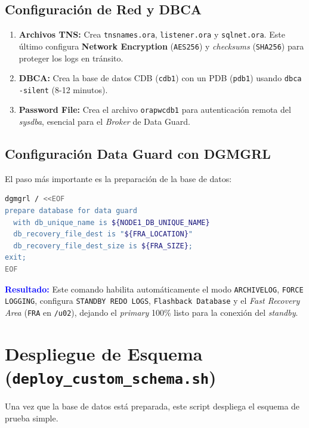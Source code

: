 \documentclass[11pt, a4paper]{report}
\newcommand{\destacado}[1]{\textbf{\textcolor{blue}{#1}}}
\begin{document}
\subsection{Configuración de Red y DBCA}
\begin{enumerate}
    \item \textbf{Archivos TNS:} Crea \texttt{tnsnames.ora}, \texttt{listener.ora} y \texttt{sqlnet.ora}.
Este último configura \textbf{Network Encryption} (\texttt{AES256}) y \textit{checksums} (\texttt{SHA256}) para proteger los logs en tránsito.
\item \textbf{DBCA:} Crea la base de datos CDB (\texttt{cdb1}) con un PDB (\texttt{pdb1}) usando \texttt{dbca -silent} (8-12 minutos).
\item \textbf{Password File:} Crea el archivo \texttt{orapwcdb1} para autenticación remota del \textit{sysdba}, esencial para el \textit{Broker} de Data Guard.
\end{enumerate}

\subsection{Configuración Data Guard con DGMGRL}

El paso más importante es la preparación de la base de datos:
\begin{lstlisting}[language=bash, caption={Comando Moderno PREPARE DATABASE}]
dgmgrl / <<EOF
prepare database for data guard
  with db_unique_name is ${NODE1_DB_UNIQUE_NAME}
  db_recovery_file_dest is "${FRA_LOCATION}"
  db_recovery_file_dest_size is ${FRA_SIZE};
exit;
EOF
\end{lstlisting}
\destacado{Resultado:} Este comando habilita automáticamente el modo \texttt{ARCHIVELOG}, \texttt{FORCE LOGGING}, configura \texttt{STANDBY REDO LOGS}, \texttt{Flashback Database} y el \textit{Fast Recovery Area} (\texttt{FRA} en \texttt{/u02}), dejando el \textit{primary} 100\% listo para la conexión del \textit{standby}.
\section{Despliegue de Esquema (\texttt{deploy\_custom\_schema.sh})}

Una vez que la base de datos está preparada, este script despliega el esquema de prueba simple.
\end{document}
